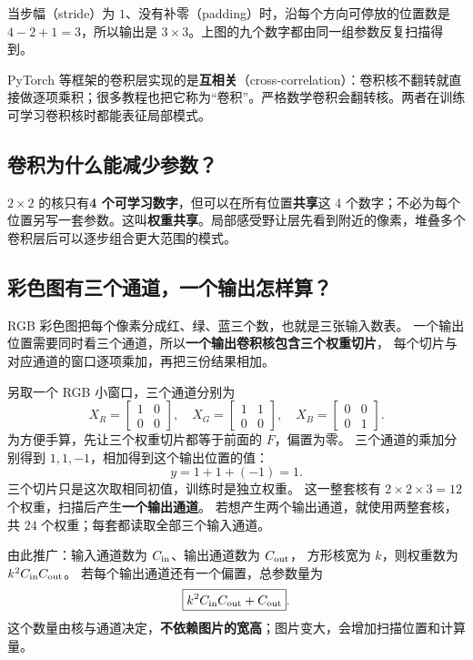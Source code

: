

当步幅（stride）为 $1$、没有补零（padding）时，沿每个方向可停放的位置数是 $4-2+1=3$，所以输出是 $3\times3$。上图的九个数字都由同一组参数反复扫描得到。

\begin{warningbox}
\label{concept:cross-correlation}PyTorch 等框架的卷积层实现的是\textbf{互相关}（cross-correlation）：卷积核不翻转就直接做逐项乘积；很多教程也把它称为“卷积”。严格数学卷积会翻转核。两者在训练可学习卷积核时都能表征局部模式。
\end{warningbox}

\subsection{卷积为什么能减少参数？}

$2\times2$ 的核只有\textbf{4 个可学习数字}，但可以在所有位置\textbf{共享}这 4 个数字；不必为每个位置另写一套参数。这叫\textbf{权重共享}。局部感受野让层先看到附近的像素，堆叠多个卷积层后可以逐步组合更大范围的模式。

\subsection{彩色图有三个通道，一个输出怎样算？}
\label{sec:cnn-channel-sum}

RGB 彩色图把每个像素分成红、绿、蓝三个数，也就是三张输入数表。
一个输出位置需要同时看三个通道，所以\textbf{一个输出卷积核包含三个权重切片}，
每个切片与对应通道的窗口逐项乘加，再把三份结果相加。

另取一个 RGB 小窗口，三个通道分别为
\[
X_R=\begin{bmatrix}1&0\\0&0\end{bmatrix},\quad
X_G=\begin{bmatrix}1&1\\0&0\end{bmatrix},\quad
X_B=\begin{bmatrix}0&0\\0&1\end{bmatrix}.
\]
为方便手算，先让三个权重切片都等于前面的 $F$，偏置为零。
三个通道的乘加分别得到 $1,1,-1$，相加得到这个输出位置的值：
\[
y=1+1+(-1)=\boxed{1}.
\]
三个切片只是这次取相同初值，训练时是独立权重。
这一整套核有 $2\times2\times3=12$ 个权重，扫描后产生\textbf{一个输出通道}。
若想产生两个输出通道，就使用两整套核，共 $24$ 个权重；每套都读取全部三个输入通道。

由此推广：输入通道数为 $C_{\rm in}$、输出通道数为 $C_{\rm out}$，
方形核宽为 $k$，则权重数为 $k^2C_{\rm in}C_{\rm out}$。
若每个输出通道还有一个偏置，总参数量为
\[
\boxed{k^2C_{\rm in}C_{\rm out}+C_{\rm out}}.
\]
这个数量由核与通道决定，\textbf{不依赖图片的宽高}；图片变大，会增加扫描位置和计算量。

